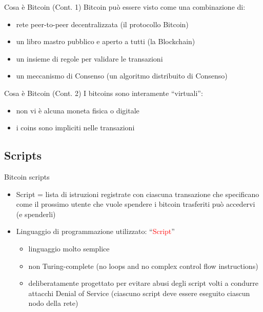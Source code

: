 \documentclass{beamer}
\newcommand\red[1]{\textcolor{red}{#1}}
\begin{document}
  \begin{frame}{Cosa è Bitcoin (Cont. 1)}
    Bitcoin può essere visto come una combinazione di: 
    \begin{itemize}
      \item rete peer-to-peer decentralizzata (il protocollo Bitcoin)
      \item un libro mastro pubblico e aperto a tutti (la Blockchain) 
      \item un insieme di regole per validare le transazioni  
      \item un meccanismo di Consenso (un algoritmo distribuito di Consenso) 
    \end{itemize}
  \end{frame}





  \begin{frame}{Cosa è Bitcoin (Cont. 2)}
    I bitcoins sono interamente ``virtuali'': 
    \begin{itemize}
      \item non vi è alcuna moneta fisica o digitale
      \item i coins sono impliciti nelle transazioni 
    \end{itemize}
  \end{frame}





  \subsection{Scripts}
  \begin{frame}{Bitcoin scripts}
    \begin{itemize}
      \item Script = lista di istruzioni registrate con ciascuna transazione che specificano come il prossimo utente che vuole spendere i bitcoin trasferiti può accedervi (e spenderli) \pause 
      \item Linguaggio di programmazione utilizzato: ``\red{Script}'' \cite{script-bitcoin-wiki} 
      \begin{itemize}
        \item linguaggio molto semplice 
        \item non Turing-complete {\tiny(no loops and no complex control flow instructions)} 
        \item deliberatamente progettato per evitare abusi degli script volti a condurre attacchi Denial of Service {\tiny(ciascuno script deve essere eseguito ciascun nodo della rete)}
      \end{itemize}
    \end{itemize}
  \end{frame}
\end{document}
